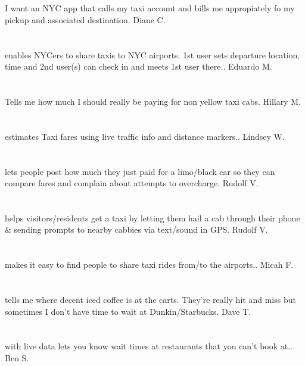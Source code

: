 \section{}I want an NYC app that calls my taxi account and bills me appropiately fo my pickup and associated destination.  Diane C.
\section{} enables NYCers to share taxis to NYC airports. 1st user sets departure location,  time and 2nd user(s) can check in and meets 1st user there.. Eduardo M.
\section{} Tells me how much I should really be paying for non  yellow taxi cabs. Hillary M.
\section{}estimates Taxi fares using live traffic info and distance markers.. Lindsey W.
\section{}lets people post how much they just paid for a limo/black car so they can compare fares and complain about attempts to overcharge. Rudolf V.
\section{} helps visitors/residents get a taxi by letting them hail a cab through their phone \& sending prompts to nearby cabbies via text/sound in GPS. Rudolf V.
\section{}makes it easy to find people to share taxi rides from/to the airports.. Micah F.
\section{}tells me where decent iced coffee is at the carts.  They're really hit and miss but sometimes I don't have time to wait at Dunkin/Starbucks. Dave T.
\section{}with live data lets you know wait times at restaurants that you can't book at.. Ben S.
